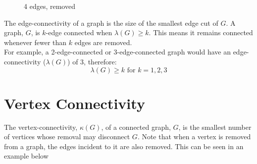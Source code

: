 \begin{minipage}{0.45\textwidth}
    \begin{figure}[H]
        \centering
        \caption{4 edges, removed}
    \end{figure}
\end{minipage}\vspace{0.5em}

The edge-connectivity of a graph is the size of the smallest edge cut of $G$. A graph, $G$, is $k$-edge connected when $\lambda(G) \geq k$. This means it remains connected whenever fewer than $k$ edges are removed.\\

For example, a 2-edge-connected or 3-edge-connected graph would have an edge-connectivity ($\lambda(G)$) of 3, therefore:
\[\lambda (G) \geq k \text{ for } k = 1, 2, 3\]

\section{Vertex Connectivity}
The vertex-connectivity, $\kappa(G)$, of a connected graph, $G$, is the smallest number of vertices whose removal may disconnect $G$. Note that when a vertex is removed from a graph, the edges incident to it are also removed. This can be seen in an example below

